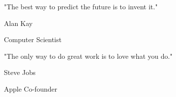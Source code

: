 \documentclass[aspectratio=169]{beamer}
\begin{document}
{
\begin{frame}[plain]
  \centering
  \vfill
  \begin{minipage}{0.75\paperwidth}
    \centering
    {\fontsize{18}{24}\selectfont\interlight\textcolor{SierraCharcoal}{%
      "The best way to predict the future is to invent it."%
    }}
    
    \vspace{1.5em}
    
    {\fontsize{11}{13}\selectfont\intermedium\textcolor{SierraTaupe}{Alan Kay}}
    
    {\fontsize{9}{11}\selectfont\interlight\textcolor{SierraTaupe}{Computer Scientist}}
  \end{minipage}
  \vfill
\end{frame}
}


{
\begin{frame}[plain]
  \centering
  \vfill
  \begin{minipage}{0.75\paperwidth}
    \centering
    {\fontsize{18}{24}\selectfont\interlight\textcolor{SierraWhite}{%
      "The only way to do great work is to love what you do."%
    }}
    
    \vspace{1.5em}
    
    {\fontsize{11}{13}\selectfont\intermedium\textcolor{SierraWhite}{Steve Jobs}}
    
    {\fontsize{9}{11}\selectfont\interlight\textcolor{SierraWhite}{Apple Co-founder}}
  \end{minipage}
  \vfill
\end{frame}
}

\end{document}
